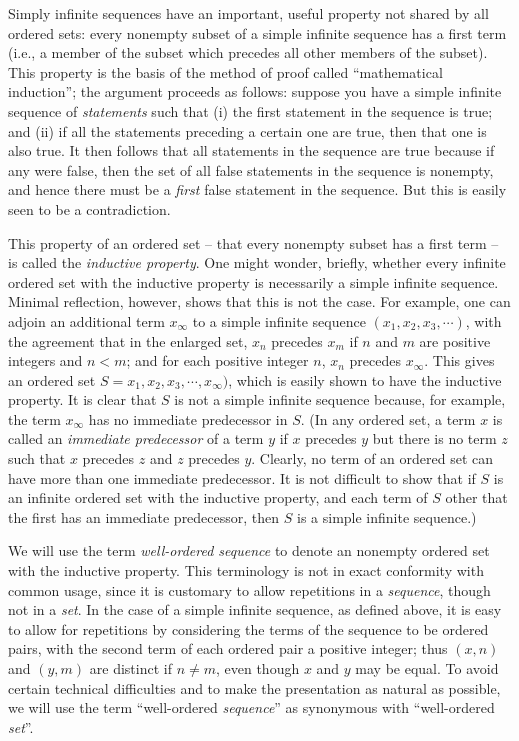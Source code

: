 \documentclass{article}
\begin{document}
Simply infinite sequences have an important, useful property not shared by all ordered sets: every nonempty subset of a simple infinite sequence has a first term (i.e., a member of the subset which precedes all other members of the subset). This property is the basis of the method of proof called ``mathematical induction''; the argument proceeds as follows: suppose you have a simple infinite sequence of \emph{statements} such that (i) the first statement in the sequence is true; and (ii) if all the statements preceding a certain one are true, then that one is also true. It then follows that all statements in the sequence are true because if any were false, then the set of all false statements in the sequence is nonempty, and hence there must be a \emph{first} false statement in the sequence. But this is easily seen to be a contradiction.

This property of an ordered set -- that every nonempty subset has a first term -- is called the \emph{inductive property}. One might wonder, briefly, whether every infinite ordered set with the inductive property is necessarily a simple infinite sequence. Minimal reflection, however, shows that this is not the case. For example, one can adjoin an additional term $x_\infty$ to a simple infinite sequence $(x_1, x_2, x_3, \cdots)$, with the agreement that in the enlarged set, $x_n$ precedes $x_m$ if $n$ and $m$ are positive integers and $n < m$; and for each positive integer $n$, $x_n$ precedes $x_\infty$. This gives an ordered set $S = x_1, x_2, x_3, \cdots, x_\infty)$, which is easily shown to have the inductive property. It is clear that $S$ is not a simple infinite sequence because, for example, the term $x_\infty$ has no immediate predecessor in $S$. (In any ordered set, a term $x$ is called an \emph{immediate predecessor} of a term $y$ if $x$ precedes $y$ but there is no term $z$ such that $x$ precedes $z$ and $z$ precedes $y$. Clearly, no term of an ordered set can have more than one immediate predecessor. It is not difficult to show that if $S$ is an infinite ordered set with the inductive property, and each term of $S$ other that the first has an immediate predecessor, then $S$ is a simple infinite sequence.)

We will use the term \emph{well-ordered sequence} to denote an nonempty ordered set with the inductive property. This terminology is not in exact conformity with common usage, since it is customary to allow repetitions in a \emph{sequence}, though not in a \emph{set}. In the case of a simple infinite sequence, as defined above, it is easy to allow for repetitions by considering the terms of the sequence to be ordered pairs, with the second term of each ordered pair a positive integer; thus $(x,n)$ and $(y,m)$ are distinct if $n \neq m$, even though $x$ and $y$ may be equal. To avoid certain technical difficulties and to make the presentation as natural as possible, we will use the term ``well-ordered \emph{sequence}'' as synonymous with ``well-ordered \emph{set}''.
\end{document}
